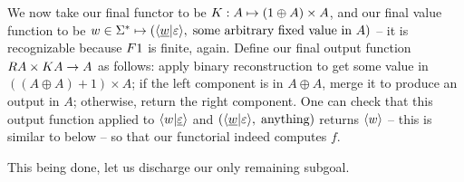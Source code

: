 We now take our final functor to be $\functork : A \mapsto (1 \oplus A)\times A$, and our final value function to be $w\in\Sigma^* \mapsto (\langle \underline{w}|\varepsilon \rangle,\;\text{some arbitrary fixed value in $A$})$ -- it is recognizable because $\functor1$ is finite, again. Define our final output function $\functorr A \times \functork A \to A$ as follows: apply binary reconstruction to get some value in $((A\oplus A)+1)\times A$; if the left component is in $A\oplus A$, merge it to produce an output in $A$; otherwise, return the right component. One can check that this output function applied to $\langle w|\underline\varepsilon \rangle$ and $(\langle \underline{w}|\varepsilon \rangle,\;\text{anything})$ returns $\langle w \rangle$ -- this is similar to  below -- so that our functorial \sst indeed computes $f$.

This being done, let us discharge our only remaining subgoal.

